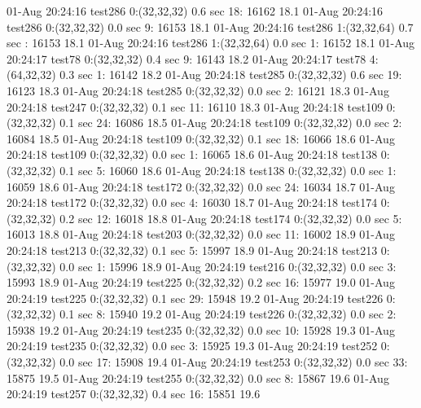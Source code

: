 01-Aug 20:24:16 test286     0:(32,32,32)     0.6 sec   18: 16162 18.1%
01-Aug 20:24:16 test286     0:(32,32,32)     0.0 sec    9: 16153 18.1%
01-Aug 20:24:16 test286     1:(32,32,64)     0.7 sec     : 16153 18.1%
01-Aug 20:24:16 test286     1:(32,32,64)     0.0 sec    1: 16152 18.1%
01-Aug 20:24:17 test78      0:(32,32,32)     0.4 sec    9: 16143 18.2%
01-Aug 20:24:17 test78      4:(64,32,32)     0.3 sec    1: 16142 18.2%
01-Aug 20:24:18 test285     0:(32,32,32)     0.6 sec   19: 16123 18.3%
01-Aug 20:24:18 test285     0:(32,32,32)     0.0 sec    2: 16121 18.3%
01-Aug 20:24:18 test247     0:(32,32,32)     0.1 sec   11: 16110 18.3%
01-Aug 20:24:18 test109     0:(32,32,32)     0.1 sec   24: 16086 18.5%
01-Aug 20:24:18 test109     0:(32,32,32)     0.0 sec    2: 16084 18.5%
01-Aug 20:24:18 test109     0:(32,32,32)     0.1 sec   18: 16066 18.6%
01-Aug 20:24:18 test109     0:(32,32,32)     0.0 sec    1: 16065 18.6%
01-Aug 20:24:18 test138     0:(32,32,32)     0.1 sec    5: 16060 18.6%
01-Aug 20:24:18 test138     0:(32,32,32)     0.0 sec    1: 16059 18.6%
01-Aug 20:24:18 test172     0:(32,32,32)     0.0 sec   24: 16034 18.7%
01-Aug 20:24:18 test172     0:(32,32,32)     0.0 sec    4: 16030 18.7%
01-Aug 20:24:18 test174     0:(32,32,32)     0.2 sec   12: 16018 18.8%
01-Aug 20:24:18 test174     0:(32,32,32)     0.0 sec    5: 16013 18.8%
01-Aug 20:24:18 test203     0:(32,32,32)     0.0 sec   11: 16002 18.9%
01-Aug 20:24:18 test213     0:(32,32,32)     0.1 sec    5: 15997 18.9%
01-Aug 20:24:18 test213     0:(32,32,32)     0.0 sec    1: 15996 18.9%
01-Aug 20:24:19 test216     0:(32,32,32)     0.0 sec    3: 15993 18.9%
01-Aug 20:24:19 test225     0:(32,32,32)     0.2 sec   16: 15977 19.0%
01-Aug 20:24:19 test225     0:(32,32,32)     0.1 sec   29: 15948 19.2%
01-Aug 20:24:19 test226     0:(32,32,32)     0.1 sec    8: 15940 19.2%
01-Aug 20:24:19 test226     0:(32,32,32)     0.0 sec    2: 15938 19.2%
01-Aug 20:24:19 test235     0:(32,32,32)     0.0 sec   10: 15928 19.3%
01-Aug 20:24:19 test235     0:(32,32,32)     0.0 sec    3: 15925 19.3%
01-Aug 20:24:19 test252     0:(32,32,32)     0.0 sec   17: 15908 19.4%
01-Aug 20:24:19 test253     0:(32,32,32)     0.0 sec   33: 15875 19.5%
01-Aug 20:24:19 test255     0:(32,32,32)     0.0 sec    8: 15867 19.6%
01-Aug 20:24:19 test257     0:(32,32,32)     0.4 sec   16: 15851 19.6%
